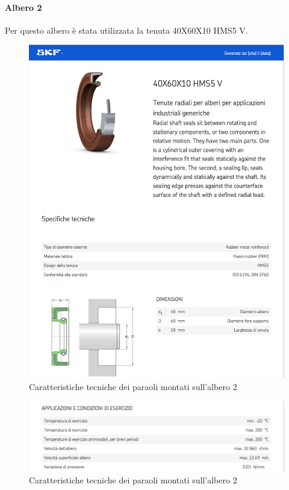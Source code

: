 \newpage

\paragraph{Albero 2}
Per questo albero è stata utilizzata la tenuta 40X60X10 HMS5 V.\\

\begin{figure}[h]
    \centering
    \includegraphics[scale=0.5]{Immagini/Paraolio1Albero2}
    \caption{Caratteristiche tecniche dei paraoli montati sull'albero 2}
    \label{fig:Paraolio1Albero2}
\end{figure}
\newpage
\begin{figure}[h]
    \centering
    \includegraphics[scale=0.5]{Immagini/Paraolio2Albero2}
    \caption{Caratteristiche tecniche dei paraoli montati sull'albero 2}
    \label{fig:Paraolio2Albero2}
\end{figure}
\newpage
